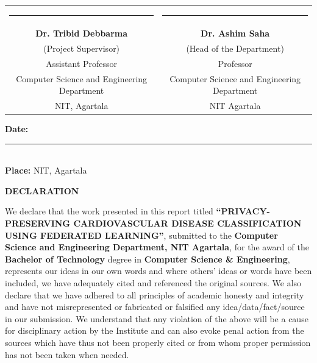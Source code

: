\documentclass{nitathesis}
\begin{document}
\vspace{3.5in}

\begin{table}[h]
\centering
\begin{tabular*}{\textwidth}{@{\extracolsep{\fill}}cc}
    \rule{6.5cm}{0.4pt} & \rule{6.5cm}{0.4pt} \\
    \textbf{Dr. Tribid Debbarma} & \textbf{Dr. Ashim Saha} \\
    (Project Supervisor) & (Head of the Department) \\
    Assistant Professor & Professor \\
    Computer Science and Engineering Department & Computer Science and Engineering Department \\
    NIT, Agartala & NIT Agartala
\end{tabular*}
\end{table}

\vspace{0.8cm}
\noindent \textbf{Date:} \rule{4cm}{0.4pt}\\
\noindent \textbf{Place:} NIT, Agartala

\cleardoublepage
\thispagestyle{plain}
\begin{center}
    \vspace*{0.3in}
    {\Large \textbf{DECLARATION}\par}
    \vspace{0.6in}
\end{center}

\noindent We declare that the work presented in this report titled \textbf{``PRIVACY-PRESERVING CARDIO\-VASCULAR DISEASE CLASSIFICATION USING FEDERATED LEARNING''}, submitted to the \textbf{Computer Science and Engineering Department, NIT Agartala}, for the award of the \textbf{Bachelor of Technology} degree in \textbf{Computer Science \& Engineering}, represents our ideas in our own words and where others' ideas or words have been included, we have adequately cited and referenced the original sources. We also declare that we have adhered to all principles of academic honesty and integrity and have not misrepresented or fabricated or falsified any idea/data/fact/source in our submission. We understand that any violation of the above will be a cause for disciplinary action by the Institute and can also evoke penal action from the sources which have thus not been properly cited or from whom proper permission has not been taken when needed.
\end{document}
